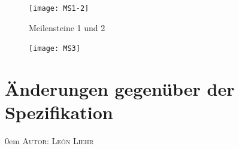 \documentclass{article}
\makeatletter
\newcommand{\sectionauthor}[1]{
	{\parindent 0em \large \scshape Autor: #1 \par \nobreak \vspace*{1em}}
	\@afterheading
}
\makeatother
\begin{document}
\begin{figure}[h]
    \centering
    \texttt{[image: MS1-2]}
    \caption{Meilensteine 1 und 2}
\end{figure}
\restoregeometry

\newpage

\begin{figure}[h]
    \centering
    \texttt{[image: MS3]}
\end{figure}
\restoregeometry

\newpage

\section{Änderungen gegenüber der Spezifikation}
\sectionauthor{León Liehr}
\end{document}
